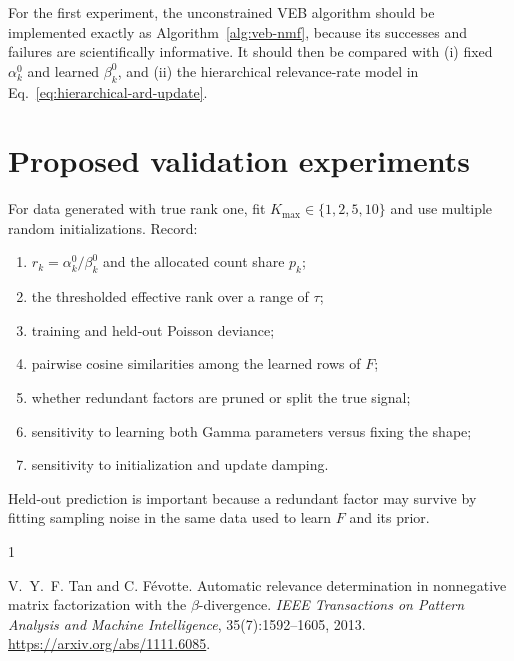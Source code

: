 \documentclass[11pt]{article}
\begin{document}
For the first experiment, the unconstrained VEB algorithm should be
implemented exactly as Algorithm~\ref{alg:veb-nmf}, because its successes and
failures are scientifically informative.  It should then be compared with
(i) fixed $\alpha_k^0$ and learned $\beta_k^0$, and (ii) the hierarchical
relevance-rate model in Eq.~\eqref{eq:hierarchical-ard-update}.


\section{Proposed validation experiments}

For data generated with true rank one, fit
$K_{\max}\in\{1,2,5,10\}$ and use multiple random initializations.  Record:
\begin{enumerate}
  \item $r_k=\alpha_k^0/\beta_k^0$ and the allocated count share $p_k$;
  \item the thresholded effective rank over a range of $\tau$;
  \item training and held-out Poisson deviance;
  \item pairwise cosine similarities among the learned rows of $F$;
  \item whether redundant factors are pruned or split the true signal;
  \item sensitivity to learning both Gamma parameters versus fixing the shape;
  \item sensitivity to initialization and update damping.
\end{enumerate}
Held-out prediction is important because a redundant factor may survive by
fitting sampling noise in the same data used to learn $F$ and its prior.


\begin{thebibliography}{1}

V.~Y.~F. Tan and C. F\'evotte.
\newblock Automatic relevance determination in nonnegative matrix
factorization with the $\beta$-divergence.
\newblock \emph{IEEE Transactions on Pattern Analysis and Machine
Intelligence}, 35(7):1592--1605, 2013.
\newblock \url{https://arxiv.org/abs/1111.6085}.

\end{thebibliography}
\end{document}
